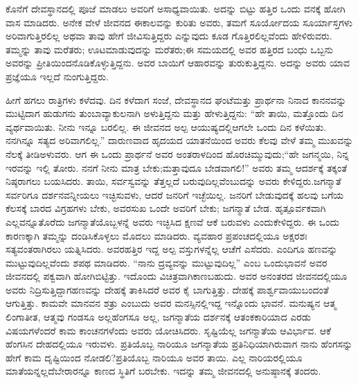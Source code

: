 ಕೊನೆಗೆ ದೇವಸ್ಥಾನದಲ್ಲಿ ಪೂಜೆ ಮಾಡಲು ಅವರಿಗೆ ಅಸಾಧ್ಯವಾಯಿತು. ಅದನ್ನು ಬಿಟ್ಟು ಹತ್ತಿರ ಒಂದು ವನಕ್ಕೆ ಹೋಗಿ ವಾಸ ಮಾಡಿದರು. ಅನೇಕ ವೇಳೆ ಜೀವನದ ಈ\break ಕಾಲವನ್ನು ಕುರಿತು ಅವರು, ತಮಗೆ ಸೂರ್ಯೋದಯ ಸೂರ್ಯಾಸ್ತಗಳು ಅರಿವಾಗು\-ತ್ತಿರಲಿಲ್ಲ ಅಥವಾ ತಾವು ಹೇಗೆ ಜೀವಿಸುತ್ತಿದ್ದರು ಎನ್ನುವುದು ಕೂಡ ಗೊತ್ತಿರಲಿಲ್ಲ\break ವೆಂದು ಹೇಳಿರುವರು. ತಮ್ಮನ್ನು ತಾವು ಮರೆತರು; ಊಟಮಾಡುವುದನ್ನು ಮರೆತರು;\break ಈ ಸಮಯದಲ್ಲಿ ಅವರ ಹತ್ತಿರದ ಬಂಧು ಒಬ್ಬನು ಅವರನ್ನು ಪ್ರೀತಿಯಿಂದ\break ನೊಡಿಕೊಳ್ಳುತ್ತಿದ್ದನು. ಅವರ ಬಾಯಿಗೆ ಆಹಾರವನ್ನು ತುರುಕುತ್ತಿದ್ದನು. ಅದನ್ನು ಅವರು ಯಾವ ಪ್ರಜ್ಞೆಯೂ ಇಲ್ಲದೆ ನುಂಗುತ್ತಿದ್ದರು.

ಹೀಗೆ ಹಗಲು ರಾತ್ರಿಗಳು ಕಳೆದವು. ದಿನ ಕಳೆದಾಗ ಸಂಜೆ, ದೇವಸ್ಥಾನದ ಘಂಟೆ\break ಮತ್ತು ಪ್ರಾರ್ಥನಾ ನಿನಾದ ಕಾನನವನ್ನು ಮುಟ್ಟಿದಾಗ ಹುಡುಗನು ತುಂಬಾ\break ವ್ಯಾಕುಲನಾಗಿ ಅಳುತ್ತಿದ್ದನು ಮತ್ತು ಹೇಳುತ್ತಿದ್ದನು: “ಹೇ ತಾಯಿ, ಮತ್ತೊಂದು ದಿನ ವ್ಯರ್ಥವಾಯಿತು. ನೀನು ಇನ್ನೂ ಬರಲಿಲ್ಲ. ಈ ಜೀವನದ ಅಲ್ಪ ಆಯುಷ್ಯದಲ್ಲಿ\break ಆಗಲೇ ಒಂದು ದಿನ ಕಳೆಯಿತು. ನನಗಿನ್ನೂ ಸತ್ಯದ ಅರಿವಾಗಲಿಲ್ಲ.” ದಾರುಣವಾದ ಹೃದಯದ ಯಾತನೆಯಿಂದ ಅವರು ಕೆಲವು ವೇಳೆ ತಮ್ಮ ಮುಖವನ್ನು ನೆಲಕ್ಕೆ ತೀಡಿ\break ಅಳುವರು. ಆಗ ಈ ಒಂದು ಪ್ರಾರ್ಥನೆ ಅವರ ಅಂತರಾಳದಿಂದ ಹೊರಚಿಮ್ಮುವುದು;\break “ಹೇ ಜಗನ್ಮಯಿ, ನಿನ್ನ ಇರವನ್ನು ಇಲ್ಲಿ ತೋರು. ನನಗೆ ನೀನು ಮಾತ್ರ ಬೇಕು;\break ಮತ್ತಾವುದೂ ಬೇಡವಾಗಲಿ!” ಅವರು ತಮ್ಮ ಆದರ್ಶಕ್ಕೆ ತಕ್ಕಂತೆ ನಿಷ್ಠರಾಗಲು ಬಯಸಿದರು. ತಾಯಿ, ಸರ್ವಸ್ವವನ್ನು ತೆತ್ತಲ್ಲದೆ ಬರುವುದಿಲ್ಲವೆಂಬುದನ್ನು ಅವರು ಕೇಳಿದ್ದರು.\break ಜಗನ್ಮಾತೆ ಸರ್ವರಿಗೂ ದರ್ಶನವನ್ನೀಯಲು ಇಚ್ಛಿಸುವಳು, ಆದರೆ ಜನರಿಗೆ ಇಚ್ಛೆಯಿಲ್ಲ. ಜನರಿಗೆ ಬೇಡುವುದಕ್ಕೆ ಹಲವು ಬಗೆಯ ಕೆಲಸಕ್ಕೆ ಬಾರದ ವಿಗ್ರಹಗಳು ಬೇಕು, ಅವರ\break ಸುಖ ಒಂದೇ ಅವರಿಗೆ ಬೇಕು; ಜಗನ್ಮಾತೆ ಬೇಡ. ಹೃತ್ಪೂರ್ವಕವಾಗಿ ಎಲ್ಲವನ್ನೂ\break ತೊರೆದು ಜಗನ್ಮಾತೆಯೊಬ್ಬಳನ್ನೆ ಅವರು ಇಚ್ಛಿಸಿದ ಕ್ಷಣವೆ ಆಕೆ ಬರುವಳು ಎಂದು\break ಕೇಳಿದ್ದರು. ಈ ಒಂದು ಕಾರಣಕ್ಕಾಗಿ ತಮ್ಮನ್ನು ದಂಡಿಸಿಕೊಳ್ಳಲು ಮೊದಲು ಮಾಡಿದರು. ವ್ಯವಹಾರ ಪ್ರಪಂಚದಲ್ಲಿಯೂ ಅಕ್ಷರಶಃ ಸತ್ಯವಂತರಾಗಿರಲು ಯತ್ನಿಸಿದರು. ಅವರ\break ಹತ್ತಿರ ಇದ್ದ ಅಲ್ಪ ವಸ್ತುಗಳನ್ನೆಲ್ಲ ಆಚೆಗೆ ಎಸೆದರು. ಎಂದಿಗೂ ಹಣವನ್ನು ಮುಟ್ಟುವುದಿಲ್ಲ\-ವೆಂದು ಶಪಥ ಮಾಡಿದರು. “ನಾನು ದ್ರವ್ಯವನ್ನು ಮುಟ್ಟುವುದಿಲ್ಲ” ಎಂಬ ಒಂದು\break ಭಾವನೆ ಅವರ ಜೀವನದಲ್ಲಿ ಪಕ್ವವಾಗಿ ಹೋಗಿಬಿಟ್ಟಿತ್ತು. ಇದೊಂದು ವಿಚಿತ್ರವಾಗಿ\break ಕಾಣಬಹುದು. ಅವರ ಅನಂತರದ ಜೀವನದಲ್ಲಿಯೂ ಅವರು ನಿದ್ರಿಸುತ್ತಿದ್ದಾಗ\break ಹಣವನ್ನು ದೇಹಕ್ಕೆ ತಾಕಿಸಿದರೆ ಅವರ ಕೈ ಬಾಗುತ್ತಿತ್ತು. ದೇಹಕ್ಕೆ ಪಾರ್ಶ್ವವಾಯು\break ಬಂದಂತೆ ಆಗುತ್ತಿತ್ತು. ಕಾಮವೇ ಮಾನವನ ಶತ್ರು ಎಂಬುದು ಅವರ ಮನಸ್ಸಿನಲ್ಲಿ\break ಇದ್ದ ಇನ್ನೊಂದು ಭಾವನೆ. ಮನುಷ್ಯನ ಆತ್ಮ ಲಿಂಗಾತೀತ, ಆತ್ಮವು ಗಂಡಸೂ ಅಲ್ಲ\break ಹೆಂಗಸೂ ಅಲ್ಲ, ಜಗನ್ಮಾತೆಯ ದರ್ಶನಕ್ಕೆ ಆತಂಕಕಾರಿಯಾದ ಎರಡು ವಿಷಯಗಳೆಂದರೆ ಕಾಮ ಕಾಂಚನಗಳೆಂದು ಅವರು ಯೋಚಿಸಿದರು. ಸೃಷ್ಟಿಯೆಲ್ಲ ಜಗನ್ಮಾತೆಯ ಆವಿರ್ಭಾವ. ಆಕೆ ಹೆಂಗಸಿನ ದೇಹದಲ್ಲಿಯೂ ಇರುವಳು. ಪ್ರತಿಯೊಬ್ಬ ನಾರಿಯೂ ಜಗನ್ಮಾತೆಯ ಪ್ರತಿನಿಧಿಯಾಗಿರುವಾಗ ನಾನು ಹೆಂಗಸನ್ನು ಹೇಗೆ ಕಾಮ ದೃಷ್ಟಿಯಿಂದ ನೋಡಲಿ?\break ಪ್ರತಿಯೊಬ್ಬ ನಾರಿಯೂ ಅವರ ತಾಯಿ. ಎಲ್ಲ ನಾರಿಯರಲ್ಲಿಯೂ ಮಾತೆಯನ್ನಲ್ಲದೆ\break ಬೇರಾರನ್ನೂ ಕಾಣದ ಸ್ಥಿತಿಗೆ ಬರಬೇಕು. ಇದನ್ನು ತಮ್ಮ ಜೀವನದಲ್ಲಿ ಅನುಷ್ಠಾನಕ್ಕೆ ತಂದರು.

